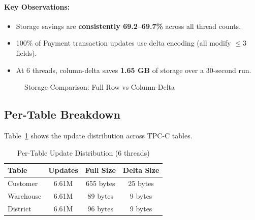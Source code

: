 \documentclass[letterpaper,twocolumn,10pt]{article}
\begin{document}
\paragraph{Key Observations:}
\begin{itemize}
\item Storage savings are \textbf{consistently 69.2--69.7\%} across all thread counts.
\item 100\% of Payment transaction updates use delta encoding (all modify $\leq 3$ fields).
\item At 6 threads, column-delta saves \textbf{1.65 GB} of storage over a 30-second run.
\end{itemize}

\begin{figure}[t]
\centering
{}
\caption{Storage Comparison: Full Row vs Column-Delta}
\label{fig:storage}
\end{figure}

\subsection{Per-Table Breakdown}

Table~\ref{tab:per-table} shows the update distribution across TPC-C tables.

\begin{table}[t]
\centering
\caption{Per-Table Update Distribution (6 threads)}
\label{tab:per-table}
\begin{tabular}{lccc}
\toprule
Table & Updates & Full Size & Delta Size \\
\midrule
Customer & 6.61M & 655 bytes & 25 bytes \\
Warehouse & 6.61M & 89 bytes & 9 bytes \\
District & 6.61M & 96 bytes & 9 bytes \\
\bottomrule
\end{tabular}
\end{table}
\end{document}
